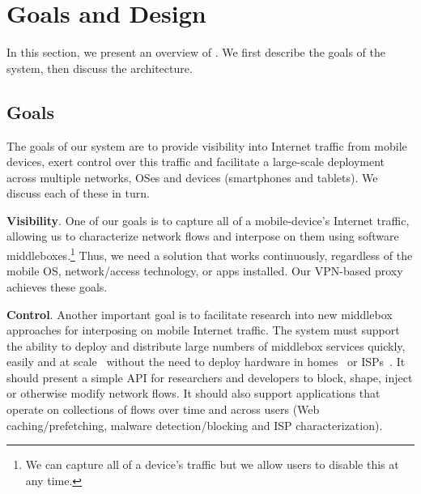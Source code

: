 \section{Goals and Design}

In this section, we present an overview of \meddle. We first describe the goals of the 
system, then discuss the \meddle architecture. 


\subsection{Goals}

The goals of our system are to provide visibility into Internet traffic from mobile devices, 
exert control over this traffic and facilitate a large-scale deployment across multiple 
networks, OSes and devices (smartphones and tablets). We discuss each of these in turn.

\noindent\textbf{Visibility}. One of our goals is to capture all of a mobile-device's Internet traffic,
allowing us to characterize network flows and interpose on them using software middleboxes.\footnote{We can capture all of a device's traffic but we allow users to disable this at any time.}  Thus, 
we need a solution that works continuously, regardless of the mobile OS, network/access 
technology, or apps installed. Our VPN-based proxy achieves these goals. 
  
\noindent\textbf{Control}. Another important goal is to facilitate research into new middlebox approaches 
for interposing on mobile Internet traffic. The system must support the ability to deploy and distribute large numbers 
of middlebox services quickly, easily and at scale~\cite{sherry:middleboxes} without 
the need to deploy hardware in homes~\cite{bismarck} or ISPs~\cite{wang:middleboxes}. 
It should present a simple API for researchers and developers to block, shape, inject or otherwise 
modify network flows. It should also support applications that operate on collections of flows over 
time and across users (\eg Web caching/prefetching, malware detection/blocking and ISP characterization). 

